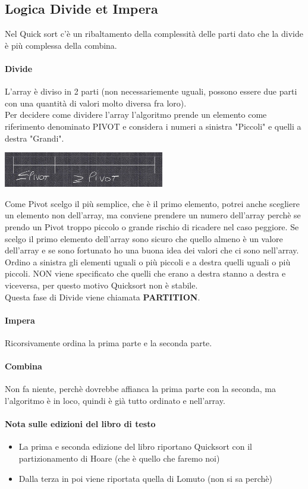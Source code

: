 \subsection{Logica Divide et Impera}
Nel Quick sort c'è un ribaltamento della complessità delle parti dato che la divide è più
complessa della combina.
\paragraph*{Divide} L'array è diviso in 2 parti (non necessariemente uguali, possono essere due
parti con una quantità di valori molto diversa fra loro).\\
Per decidere come dividere l'array l'algoritmo prende un elemento come riferimento denominato
PIVOT e considera i numeri a sinistra "Piccoli" e quelli a destra "Grandi".\\
\begin{center}
    \includegraphics[width=70mm, scale=0.5]{img/quicksort_pivot.jpg}
\end{center}
Come Pivot scelgo il più semplice, che è il primo elemento, potrei anche scegliere un elemento non 
dell'array, ma conviene prendere un numero dell'array perchè se prendo un Pivot troppo piccolo
o grande rischio di ricadere nel caso peggiore. Se scelgo il primo elemento dell'array sono sicuro che
quello almeno è un valore dell'array e se sono fortunato ho una buona idea dei valori che ci sono
nell'array.\\
Ordino a sinistra gli elementi uguali o più piccoli e a destra quelli uguali o più piccoli. NON viene
specificato che quelli che erano a destra stanno a destra e viceversa, per questo motivo Quicksort non
è stabile.\\
Questa fase di Divide viene chiamata \textbf{PARTITION}.
\paragraph*{Impera} Ricorsivamente ordina la prima parte e la seconda parte.
\paragraph*{Combina} Non fa niente, perchè dovrebbe affianca la prima parte con la seconda, ma
l'algoritmo è in loco, quindi è già tutto ordinato e nell'array.
\paragraph*{Nota sulle edizioni del libro di testo}
\begin{itemize}
    \item La prima e seconda edizione del libro riportano Quicksort con il partizionamento di Hoare (che è
    quello che faremo noi)
    \item Dalla terza in poi viene riportata quella di Lomuto (non si sa perchè)
\end{itemize}
